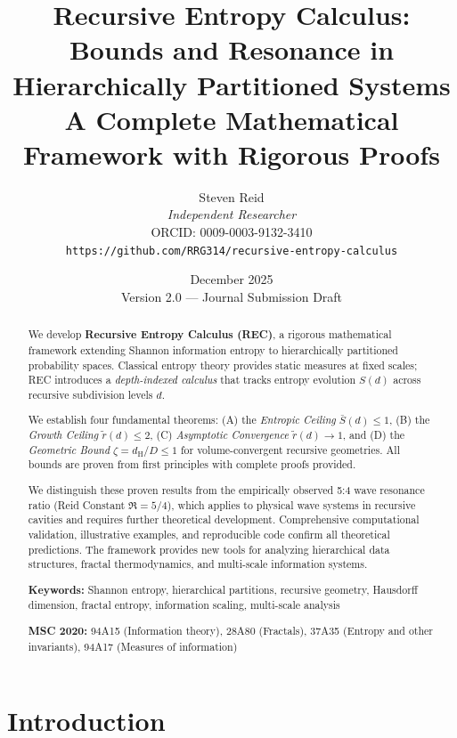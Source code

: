 \documentclass[11pt,a4paper]{article}
\title{%
    \textbf{Recursive Entropy Calculus: \\[0.3em] 
    Bounds and Resonance in Hierarchically Partitioned Systems} \\[1em]
    \large A Complete Mathematical Framework with Rigorous Proofs
}
\author{
    Steven Reid \\[0.5em]
    \textit{Independent Researcher} \\
    ORCID: 0009-0003-9132-3410 \\[0.3em]
    \texttt{https://github.com/RRG314/recursive-entropy-calculus}
}
\date{December 2025 \\ \small Version 2.0 --- Journal Submission Draft}
\theoremstyle{definition}
\theoremstyle{remark}
\newcommand{\dH}{d_{\mathrm{H}}}
\newcommand{\Sbar}{\bar{S}}
\newcommand{\rtilde}{\tilde{r}}
\begin{document}
\maketitle

\begin{abstract}
We develop \textbf{Recursive Entropy Calculus (REC)}, a rigorous mathematical framework extending Shannon information entropy to hierarchically partitioned probability spaces. Classical entropy theory provides static measures at fixed scales; REC introduces a \emph{depth-indexed calculus} that tracks entropy evolution $S(d)$ across recursive subdivision levels $d$. 

We establish four fundamental theorems: (A) the \emph{Entropic Ceiling} $\Sbar(d) \leq 1$, (B) the \emph{Growth Ceiling} $\rtilde(d) \leq 2$, (C) \emph{Asymptotic Convergence} $\rtilde(d) \to 1$, and (D) the \emph{Geometric Bound} $\zeta = \dH/D \leq 1$ for volume-convergent recursive geometries. All bounds are proven from first principles with complete proofs provided.

We distinguish these proven results from the empirically observed 5:4 wave resonance ratio (Reid Constant $\mathfrak{R} = 5/4$), which applies to physical wave systems in recursive cavities and requires further theoretical development. Comprehensive computational validation, illustrative examples, and reproducible code confirm all theoretical predictions. The framework provides new tools for analyzing hierarchical data structures, fractal thermodynamics, and multi-scale information systems.

\medskip
\noindent\textbf{Keywords:} Shannon entropy, hierarchical partitions, recursive geometry, Hausdorff dimension, fractal entropy, information scaling, multi-scale analysis

\medskip
\noindent\textbf{MSC 2020:} 94A15 (Information theory), 28A80 (Fractals), 37A35 (Entropy and other invariants), 94A17 (Measures of information)
\end{abstract}

\tableofcontents
\newpage

\section{Introduction}
\label{sec:intro}
\end{document}
